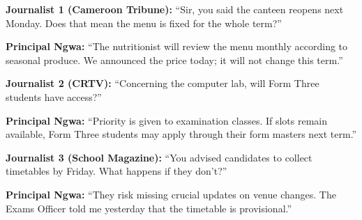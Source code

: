 \documentclass[11pt]{article}
\begin{document}
\begin{textebox}
\textbf{Journalist 1 (Cameroon Tribune):} “Sir, you said the canteen reopens next Monday. Does that mean the menu is fixed for the whole term?”

\textbf{Principal Ngwa:} “The nutritionist will review the menu monthly according to seasonal produce. We announced the price today; it will not change this term.”

\textbf{Journalist 2 (CRTV):} “Concerning the computer lab, will Form Three students have access?”

\textbf{Principal Ngwa:} “Priority is given to examination classes. If slots remain available, Form Three students may apply through their form masters next term.”

\textbf{Journalist 3 (School Magazine):} “You advised candidates to collect timetables by Friday. What happens if they don't?”

\textbf{Principal Ngwa:} “They risk missing crucial updates on venue changes. The Exams Officer told me yesterday that the timetable is provisional.”
\end{textebox}
\end{document}
